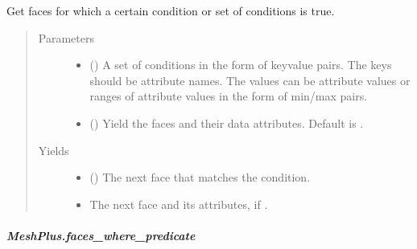 \documentclass[letterpaper,10pt,english]{sphinxmanual}
\begin{document}
\begin{fulllineitems}
\begin{fulllineitems}
\label{\detokenize{api/generated/directional_clustering.mesh.MeshPlus.faces_where:directional_clustering.mesh.MeshPlus.faces_where}}
Get faces for which a certain condition or set of conditions is true.
\begin{quote}\begin{description}
\item[{Parameters}] \leavevmode\begin{itemize}
\item {} 
 () \textendash{} A set of conditions in the form of key\sphinxhyphen{}value pairs.
The keys should be attribute names. The values can be attribute
values or ranges of attribute values in the form of min/max pairs.

\item {} 
 () \textendash{} Yield the faces and their data attributes.
Default is .

\end{itemize}

\item[{Yields}] \leavevmode\begin{itemize}
\item {} 
 () \textendash{} The next face that matches the condition.

\item {} 
 \textendash{} The next face and its attributes, if .

\end{itemize}

\end{description}\end{quote}

\end{fulllineitems}



\subparagraph{MeshPlus.faces\_where\_predicate}
\label{\detokenize{api/generated/directional_clustering.mesh.MeshPlus.faces_where_predicate:meshplus-faces-where-predicate}}\label{\detokenize{api/generated/directional_clustering.mesh.MeshPlus.faces_where_predicate::doc}}


\end{fulllineitems}
\end{document}
